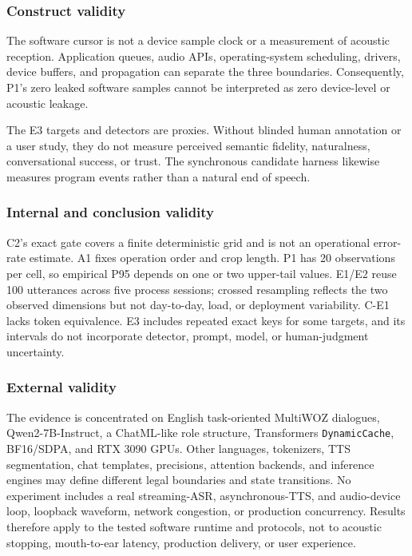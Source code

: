 \subsubsection{Construct validity}

The software cursor is not a device sample clock or a measurement of acoustic reception. Application queues, audio APIs, operating-system scheduling, drivers, device buffers, and propagation can separate the three boundaries. Consequently, P1's zero leaked software samples cannot be interpreted as zero device-level or acoustic leakage.

The E3 targets and detectors are proxies. Without blinded human annotation or a user study, they do not measure perceived semantic fidelity, naturalness, conversational success, or trust. The synchronous candidate harness likewise measures program events rather than a natural end of speech.

\subsubsection{Internal and conclusion validity}

C2's exact gate covers a finite deterministic grid and is not an operational error-rate estimate. A1 fixes operation order and crop length. P1 has 20 observations per cell, so empirical P95 depends on one or two upper-tail values. E1/E2 reuse 100 utterances across five process sessions; crossed resampling reflects the two observed dimensions but not day-to-day, load, or deployment variability. C-E1 lacks token equivalence. E3 includes repeated exact keys for some targets, and its intervals do not incorporate detector, prompt, model, or human-judgment uncertainty.

\subsubsection{External validity}

The evidence is concentrated on English task-oriented MultiWOZ dialogues, Qwen2-7B-Instruct, a ChatML-like role structure, Transformers \texttt{DynamicCache}, BF16/SDPA, and RTX 3090 GPUs. Other languages, tokenizers, TTS segmentation, chat templates, precisions, attention backends, and inference engines may define different legal boundaries and state transitions. No experiment includes a real streaming-ASR, asynchronous-TTS, and audio-device loop, loopback waveform, network congestion, or production concurrency. Results therefore apply to the tested software runtime and protocols, not to acoustic stopping, mouth-to-ear latency, production delivery, or user experience.

